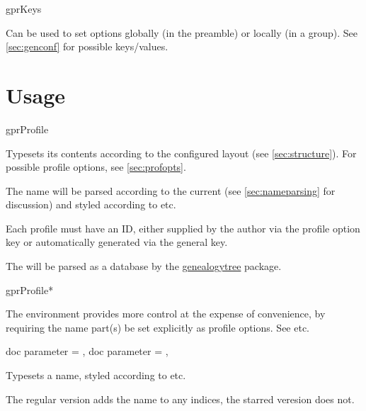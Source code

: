 \documentclass[
	a4paper,
]{article}
\begin{document}
\begin{docCommand}
	{gprKeys}
	{}

	Can be used to set options globally (in the preamble) or locally (in a group). See \cref{sec:genconf} for possible keys/values.

\end{docCommand}

\section{Usage} %

\begin{docEnvironment}
	{gprProfile}
	{}

	Typesets its contents according to the configured layout (see \cref{sec:structure}). For possible profile options, see \cref{sec:profopts}.

	The name will be parsed according to the current  (see \cref{sec:nameparsing} for discussion) and styled according to  etc.

	Each profile must have an ID, either supplied by the author via the  profile option key or automatically generated via the general  key.

	The  will be parsed as a database by the \href{https://ctan.org/pkg/genealogytree}{genealogytree} package.
	
\end{docEnvironment}

\begin{docEnvironment}
	{gprProfile*}
	{}

	The  environment provides more control at the expense of convenience, by requiring the name part(s) be set explicitly as profile options. See  etc.
	
\end{docEnvironment}


\begin{docCommands}[
		doc name = {gprName}
	]
	{
		{ doc parameter = {}},
		{ doc parameter = {\sarg{}}},
	}

	Typesets a name, styled according to  etc.

	The regular version adds the name to any indices, the starred veresion does not.
	
\end{docCommands}
\end{document}
